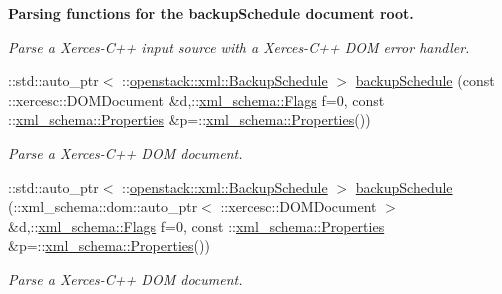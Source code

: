 \begin{Indent}{\bf Parsing functions for the backupSchedule document root.}
\begin{DoxyCompactItemize}
\begin{DoxyCompactList}\small\item\em Parse a Xerces-\/C++ input source with a Xerces-\/C++ DOM error handler. \item\end{DoxyCompactList}\item 
::std::auto\_\-ptr$<$ ::\hyperlink{classopenstack_1_1xml_1_1BackupSchedule}{openstack::xml::BackupSchedule} $>$ \hyperlink{namespaceopenstack_1_1xml_aa7d02b84a8a48205ac3615c9027d8240}{backupSchedule} (const ::xercesc::DOMDocument \&d,::\hyperlink{namespacexml__schema_affb4c227cbd9aa7453dd1dc5a1401943}{xml\_\-schema::Flags} f=0, const ::\hyperlink{namespacexml__schema_ad27ce19a7ee1d3b1064092648898f64c}{xml\_\-schema::Properties} \&p=::\hyperlink{namespacexml__schema_ad27ce19a7ee1d3b1064092648898f64c}{xml\_\-schema::Properties}())
\begin{DoxyCompactList}\small\item\em Parse a Xerces-\/C++ DOM document. \item\end{DoxyCompactList}\item 
::std::auto\_\-ptr$<$ ::\hyperlink{classopenstack_1_1xml_1_1BackupSchedule}{openstack::xml::BackupSchedule} $>$ \hyperlink{namespaceopenstack_1_1xml_a4a1970cf4ec8d917e3c781430ad8ebad}{backupSchedule} (::xml\_\-schema::dom::auto\_\-ptr$<$ ::xercesc::DOMDocument $>$ \&d,::\hyperlink{namespacexml__schema_affb4c227cbd9aa7453dd1dc5a1401943}{xml\_\-schema::Flags} f=0, const ::\hyperlink{namespacexml__schema_ad27ce19a7ee1d3b1064092648898f64c}{xml\_\-schema::Properties} \&p=::\hyperlink{namespacexml__schema_ad27ce19a7ee1d3b1064092648898f64c}{xml\_\-schema::Properties}())
\begin{DoxyCompactList}\small\item\em Parse a Xerces-\/C++ DOM document. \item\end{DoxyCompactList}\end{DoxyCompactItemize}
\end{Indent}
